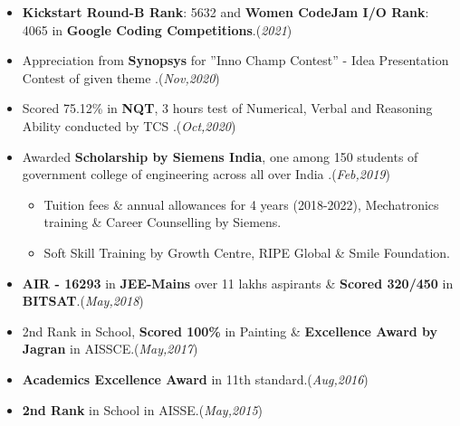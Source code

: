 \documentclass[10pt]{extarticle}
\begin{document}
    \begin{itemize}
         \item \textbf{Kickstart Round-B Rank}: 5632 \href{https://drive.google.com/file/d/1LsFgjid-EoDQHQq91LWicyegafVAtmCc/view?usp=sharing}{\color{blue}} and \textbf{Women CodeJam I/O Rank}: 4065 \href{https://drive.google.com/file/d/1LsDfhp0fyK9fyNiSBHvNpPuZ4PJZGUOA/view?usp=sharing}{\color{blue}} in \textbf{Google Coding Competitions}.\hfill\hfill(\textit{2021})
         \item Appreciation from \textbf{Synopsys} for ”Inno Champ Contest” - Idea Presentation Contest of given theme \href{https://drive.google.com/file/d/1Zv0M_kMdqlZwq2BzI__InScP3grGPLfp/view?usp=sharing}{\color{blue}}.\hfill\hfill(\textit{Nov,2020})
         \item Scored 75.12\% in \textbf{NQT}, 3 hours test of Numerical, Verbal and Reasoning Ability conducted by TCS \href{https://drive.google.com/file/d/1FfOOm94LawOPaGOGxPQHwiO4TyZkc5h6/view?usp=sharing}{\color{blue}}.\hfill\hfill(\textit{Oct,2020})
         \item Awarded \textbf{Scholarship by Siemens India}, one among 150 students of government college of engineering across all over India \href{https://drive.google.com/file/d/1XFUYs_kH-7Q7BmaebOLJVNOLyD0d4iTg/view?usp=sharing}{\color{blue}}.\hfill\hfill(\textit{Feb,2019})
          \begin{itemize}
            \item Tuition fees \& annual allowances for 4 years (2018-2022), Mechatronics training \& Career Counselling by Siemens.
            \item Soft Skill Training by Growth Centre, RIPE Global \& Smile Foundation.
          \end{itemize}
        \item \textbf{AIR - 16293} in \textbf{JEE-Mains} over 11 lakhs aspirants \& \textbf{Scored 320/450} in \textbf{BITSAT}.\hfill\hfill(\textit{May,2018})
        \item 2nd Rank in School, \textbf{Scored 100\%} in Painting \& \textbf{Excellence Award by Jagran} in AISSCE.\hfill\hfill(\textit{May,2017})
        \item \textbf{Academics Excellence Award} in 11th standard.\hfill\hfill(\textit{Aug,2016})
        \item \textbf{2nd Rank} in School in AISSE.\hfill\hfill(\textit{May,2015})
    \end{itemize}
\vspace{2mm}
\end{document}
